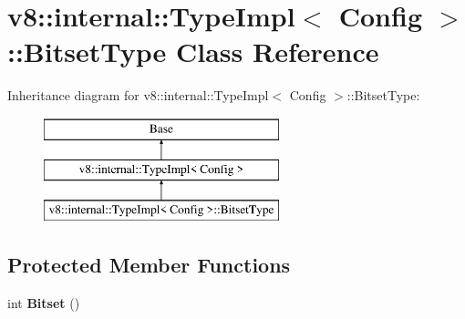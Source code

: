 \hypertarget{classv8_1_1internal_1_1_type_impl_1_1_bitset_type}{}\section{v8\+:\+:internal\+:\+:Type\+Impl$<$ Config $>$\+:\+:Bitset\+Type Class Reference}
\label{classv8_1_1internal_1_1_type_impl_1_1_bitset_type}
Inheritance diagram for v8\+:\+:internal\+:\+:Type\+Impl$<$ Config $>$\+:\+:Bitset\+Type\+:\begin{figure}[H]
\begin{center}
\leavevmode
\includegraphics[height=3.000000cm]{classv8_1_1internal_1_1_type_impl_1_1_bitset_type}
\end{center}
\end{figure}
\subsection*{Protected Member Functions}
\begin{DoxyCompactItemize}
\item 
\hypertarget{classv8_1_1internal_1_1_type_impl_1_1_bitset_type_a4e5037f347896eb2e75554e8f323263e}{}int {\bfseries Bitset} ()\label{classv8_1_1internal_1_1_type_impl_1_1_bitset_type_a4e5037f347896eb2e75554e8f323263e}

\end{DoxyCompactItemize}
